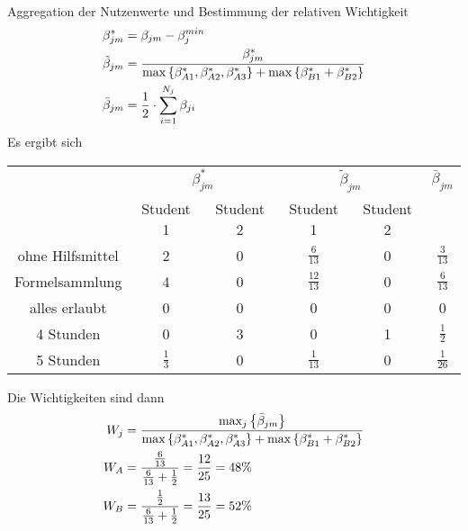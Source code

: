 \documentclass{article}
\begin{document}
	Aggregation der Nutzenwerte und Bestimmung der relativen Wichtigkeit
	\begin{align}
		\beta_{jm}^\ast &= \beta_{jm} - \beta_j^{min} \notag \\
		\tilde{\beta}_{jm} &= \frac{\beta_{jm}^\ast}{\max\left\lbrace \beta_{A1}^\ast,\beta_{A2}^\ast,\beta_{A3}^\ast\right\rbrace  + \max\left\lbrace \beta_{B1}^\ast + \beta_{B2}^\ast\right\rbrace } \notag \\
		\bar{\beta}_{jm} &= \frac{1}{2}\cdot\sum_{i=1}^{N_j} \beta_{ji} \notag
	\end{align}
	Es ergibt sich
	\begin{center}
		\begin{tabular}{c|cc|cc|c}
			& \multicolumn{2}{c|}{$\beta^\ast_{jm}$} & \multicolumn{2}{c|}{$\tilde{\beta}_{jm}$} & $\bar{\beta}_{jm}$ \\
			& Student 1 & Student 2 & Student 1 & Student 2 & \\
			\hline
			ohne Hilfsmittel & 2 & 0 & $\frac{6}{13}$ & 0 & $\frac{3}{13}$ \\
			Formelsammlung & 4 & 0 & $\frac{12}{13}$ & 0 & $\frac{6}{13}$ \\
			alles erlaubt & 0 & 0 & 0 & 0 & 0 \\
			\hline
			4 Stunden & 0 & 3 & 0 & 1 & $\frac{1}{2}$ \\
			5 Stunden & $\frac{1}{3}$ & 0 & $\frac{1}{13}$ & 0 & $\frac{1}{26}$
		\end{tabular}
	\end{center}
	Die Wichtigkeiten sind dann
	\begin{align}
		W_j &= \frac{\max_j\left\lbrace \bar{\beta}_{jm}\right\rbrace }{\max\left\lbrace \beta_{A1}^\ast,\beta_{A2}^\ast,\beta_{A3}^\ast\right\rbrace  + \max\left\lbrace \beta_{B1}^\ast + \beta_{B2}^\ast\right\rbrace } \notag \\
		W_A &= \frac{\frac{6}{13}}{\frac{6}{13} + \frac{1}{2}} = \frac{12}{25} = 48\% \notag \\
		W_B &= \frac{\frac{1}{2}}{\frac{6}{13} + \frac{1}{2}} = \frac{13}{25} = 52\% \notag
	\end{align}
\end{document}

